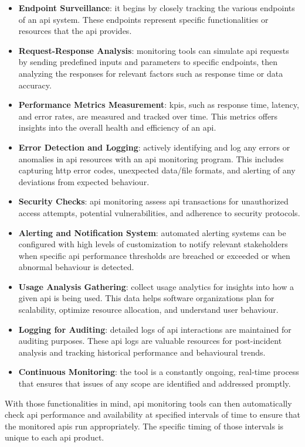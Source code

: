 \begin{itemize}
    \item \textbf{Endpoint Surveillance}: it begins by closely tracking the various endpoints of an \acrshort{api}
          system. These endpoints represent specific functionalities or resources that the \acrshort{api} provides.
    \item \textbf{Request-Response Analysis}: monitoring tools can simulate \acrshort{api} requests by sending
          predefined inputs and parameters to specific endpoints, then analyzing the responses for relevant factors
          such as response time or data accuracy.
    \item \textbf{Performance Metrics Measurement}: \acrshort{kpi}s, such as response time, latency, and error rates,
          are measured and tracked over time. This metrics offers insights into the overall health and efficiency of
          an \acrshort{api}.
    \item \textbf{Error Detection and Logging}: actively identifying and log any errors or anomalies in \acrshort{api}
          resources with an \acrshort{api} monitoring program. This includes capturing \acrshort{http} error codes,
          unexpected data/file formats, and alerting of any deviations from expected behaviour.
    \item \textbf{Security Checks}: \acrshort{api} monitoring assess \acrshort{api} transactions for unauthorized
          access attempts, potential vulnerabilities, and adherence to security protocols.
    \item \textbf{Alerting and Notification System}: automated alerting systems can be configured with high levels of
          customization to notify relevant stakeholders when specific \acrshort{api} performance thresholds are breached
          or exceeded or when abnormal behaviour is detected.
    \item \textbf{Usage Analysis Gathering}: collect usage analytics for insights into how a given \acrshort{api} is
          being used. This data helps software organizations plan for scalability, optimize resource allocation, and
          understand user behaviour.
    \item \textbf{Logging for Auditing}: detailed logs of \acrshort{api} interactions are maintained for auditing
          purposes. These \acrshort{api} logs are valuable resources for post-incident analysis and tracking historical
          performance and behavioural trends.
    \item \textbf{Continuous Monitoring}: the tool is a constantly ongoing, real-time process that ensures that
          issues of any scope are identified and addressed promptly.
\end{itemize}
With those functionalities in mind, \acrshort{api} monitoring tools can then automatically check \acrshort{api}
performance and availability at specified intervals of time to ensure that the monitored \acrshort{api}s run
appropriately. The specific timing of those intervals is unique to each \acrshort{api} product.